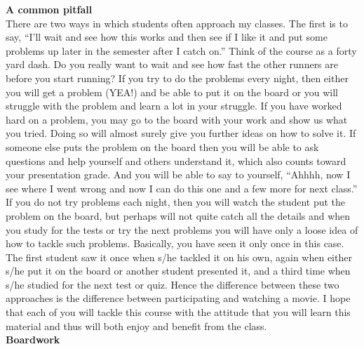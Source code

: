 \noindent
\textbf{A common pitfall}\\

There are two ways in which students often approach my classes.  The first is to say, ``I'll wait and see how this works and then see if I like it and put some problems up later in the semester after I catch on.''   Think of the course as a forty yard dash.  Do you really want to wait and see how fast the other runners are before you start running? If you try to do the problems every night, then either you will get a problem (YEA!) and be able to put it on the board or you will struggle with the problem and learn a lot in your struggle.  If you have worked hard on a problem, you may go to the board with your work and show us what you tried.   Doing so will almost surely give you further ideas on how to solve it.  If someone else puts the problem on the board then you will be able to ask questions and help yourself and others understand it, which also counts toward your presentation grade.   And you will be able to say to yourself, ``Ahhhh, now I see where I went wrong and now I can do this one and a few more for next class.''  If you do not try problems each night, then you will watch the student put the problem on the board, but perhaps will not quite catch all the details and when you study for the tests or try the next problems you will have only a loose idea of how to tackle such problems.  Basically, you have seen it only once in this case.  The first student saw it once when s/he tackled it on his own, again when either s/he put it on the board or another student presented it, and a third time when s/he studied for the next test or quiz. Hence the difference between these two approaches is the difference between participating and watching a movie.  I hope that each of you will tackle this course with the attitude that you will learn this material and thus will both enjoy and benefit from the class.\\

\noindent
\textbf{Boardwork}\\

